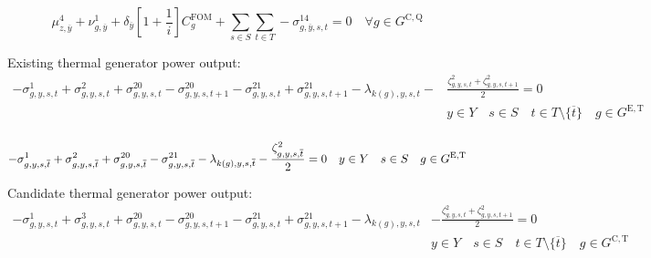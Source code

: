 \documentclass{article}
\newcommand{\sGeneratorsExistingThermal}{G^{\mathrm{E,T}}}
\newcommand{\sGeneratorsCandidateThermal}{G^{\mathrm{C,T}}}
\newcommand{\sStorageCandidate}{G^{\mathrm{C,Q}}}
\newcommand{\sYears}{Y}
\newcommand{\sScenarios}{S}
\newcommand{\sIntervals}{T}
\newcommand{\iGenerator}{g}
\newcommand{\iYear}{y}
\newcommand{\iYearTerminal}{\overline{\iYear}}
\newcommand{\iScenario}{s}
\newcommand{\iInterval}{t}
\newcommand{\iIntervalTerminal}{\overline{\iInterval}}
\newcommand{\iZone}{z}
\newcommand{\cFixedOperationsMaintenanceCostGenerator}[1][\iGenerator]{C^{\mathrm{FOM}}_{#1}}
\newcommand{\cInterestRate}{i}
\newcommand{\cDiscountRate}[1][\iYear]{\delta_{#1}}
\newcommand{\dStorageBuildLimit}[1][\iZone,\iYear]{\mu_{#1}^{4}}
\newcommand{\dTotalInstallCapacity}[1][\iGenerator,\iYear]{\nu_{#1}^{1}}
\newcommand{\dMinPowerOutput}[1][\iGenerator,\iYear,\iScenario,\iInterval]{\sigma_{#1}^{1}}
\newcommand{\dMaxPowerOutputExistingThermal}[1][\iGenerator,\iYear,\iScenario,\iInterval]{\sigma_{#1}^{2}}
\newcommand{\dMaxPowerOutputCandidateThermal}[1][\iGenerator,\iYear,\iScenario,\iInterval]{\sigma_{#1}^{3}}
\newcommand{\dMaxDischargingRateCandidate}[1][\iGenerator,\iYear,\iScenario,\iInterval]{\sigma_{#1}^{14}}
\newcommand{\dRampRateUp}[1][\iGenerator,\iYear,\iScenario,\iInterval]{\sigma_{#1}^{20}}
\newcommand{\dRampRateDown}[1][\iGenerator,\iYear,\iScenario,\iInterval]{\sigma_{#1}^{21}}
\newcommand{\dPowerBalance}[1][\iZone,\iYear,\iScenario,\iInterval]{\lambda_{#1}}
\newcommand{\dGeneratorEnergyOutput}[1][\iGenerator,\iYear,\iScenario,\iInterval]{\zeta_{#1}^{2}}
\begin{document}
\begin{equation}
\dStorageBuildLimit[\iZone,\iYearTerminal] + \dTotalInstallCapacity[\iGenerator,\iYearTerminal] + \cDiscountRate[\iYearTerminal] \left[1 + \frac{1}{\cInterestRate}\right] \cFixedOperationsMaintenanceCostGenerator + \sum\limits_{\iScenario \in \sScenarios}\sum\limits_{\iInterval \in \sIntervals} - \dMaxDischargingRateCandidate[\iGenerator,\iYearTerminal,\iScenario,\iInterval] = 0 \quad \forall \iGenerator \in \sStorageCandidate
\end{equation}

Existing thermal generator power output:
\begin{align}
-\dMinPowerOutput + \dMaxPowerOutputExistingThermal + \dRampRateUp - \dRampRateUp[\iGenerator,\iYear,\iScenario,\iInterval+1] - \dRampRateDown + \dRampRateDown[\iGenerator,\iYear,\iScenario,\iInterval+1] - \dPowerBalance[k(\iGenerator),\iYear,\iScenario,\iInterval] - & \frac{\dGeneratorEnergyOutput + \dGeneratorEnergyOutput[\iGenerator,\iYear,\iScenario,\iInterval+1]}{2} = 0\\\nonumber
& \iYear \in \sYears \quad \iScenario \in \sScenarios \quad \iInterval \in \sIntervals \setminus \{\iIntervalTerminal\} \quad \iGenerator \in \sGeneratorsExistingThermal\\\nonumber
\end{align}

\begin{equation}
-\dMinPowerOutput[\iGenerator,\iYear,\iScenario,\iIntervalTerminal] + \dMaxPowerOutputExistingThermal[\iGenerator,\iYear,\iScenario,\iIntervalTerminal] + \dRampRateUp[\iGenerator,\iYear,\iScenario,\iIntervalTerminal] - \dRampRateDown[\iGenerator,\iYear,\iScenario,\iIntervalTerminal] - \dPowerBalance[k(\iGenerator),\iYear,\iScenario,\iIntervalTerminal] - \frac{\dGeneratorEnergyOutput[\iGenerator,\iYear,\iScenario,\iIntervalTerminal]}{2} = 0 \quad \iYear \in \sYears \quad \iScenario \in \sScenarios \quad \iGenerator \in \sGeneratorsExistingThermal\\
\end{equation}

Candidate thermal generator power output:
\begin{align}
-\dMinPowerOutput + \dMaxPowerOutputCandidateThermal + \dRampRateUp - \dRampRateUp[\iGenerator,\iYear,\iScenario,\iInterval+1] - \dRampRateDown + \dRampRateDown[\iGenerator,\iYear,\iScenario,\iInterval+1] - \dPowerBalance[k(\iGenerator),\iYear,\iScenario,\iInterval] & - \frac{\dGeneratorEnergyOutput + \dGeneratorEnergyOutput[\iGenerator,\iYear,\iScenario,\iInterval+1]}{2} = 0\\\nonumber
& \iYear \in \sYears \quad \iScenario \in \sScenarios \quad \iInterval \in \sIntervals \setminus \{\iIntervalTerminal\} \quad \iGenerator \in \sGeneratorsCandidateThermal\\\nonumber
\end{align}
\end{document}
